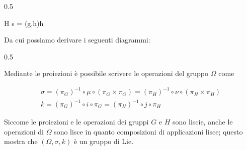 	{0.5}{%
				{\Omega}{H}
				{s = (g,h)}{h}
			
			}
		
Da cui possiamo derivare i seguenti diagrammi:

	{0.5}{%
			}

Mediante le proiezioni è possibile scrivere le operazioni del gruppo $ \Omega $ come

\begin{gather}
		\sigma = (\pi_{G})^{-1} \circ \mu \circ (\pi_{G} \times \pi_{G}) %
		= (\pi_{H})^{-1} \circ \nu \circ (\pi_{H} \times \pi_{H})\\
		k = (\pi_{G})^{-1} \circ i \circ \pi_{G} %
		= (\pi_{H})^{-1} \circ j \circ \pi_{H}
\end{gather}

Siccome le proiezioni e le operazioni dei gruppi $ G $ e $ H $ sono liscie, anche le operazioni di $ \Omega $ sono lisce in quanto composizioni di applicazioni lisce; questo mostra che $ (\Omega, \sigma, k) $ è un gruppo di Lie.

